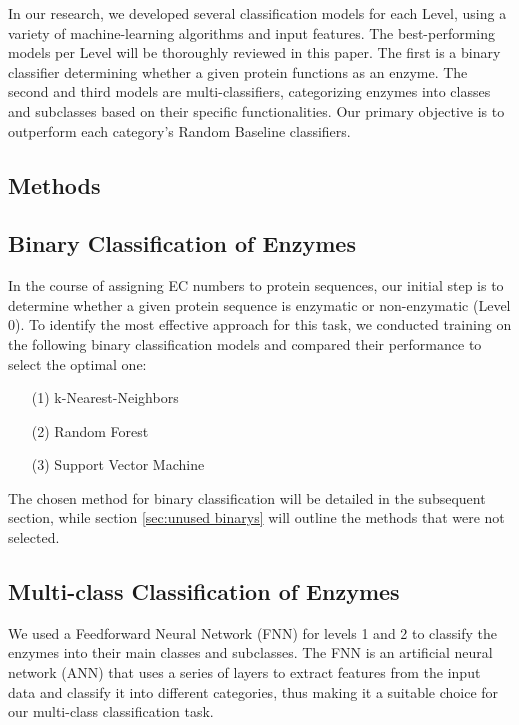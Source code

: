 \documentclass{bioinfo}
\begin{document}
In our research, we developed several classification models for each Level, using a variety of machine-learning algorithms and input features.
The best-performing models per Level will be thoroughly reviewed in this paper.
The first is a binary classifier determining whether a given protein functions as an enzyme. 
The second and third models are multi-classifiers, categorizing enzymes into classes and subclasses 
based on their specific functionalities. 
Our primary objective is to outperform each category's Random Baseline classifiers.

\begin{methods}
\section{Methods}

\subsection{Binary Classification of Enzymes}
In the course of assigning EC numbers to protein sequences,
our initial step is to determine whether a given protein sequence is enzymatic or non-enzymatic (Level 0).
To identify the most effective approach for this task,
we conducted training on the following binary classification models and compared their performance to select the optimal one:
\begin{enumerate}
	\item[(1)] k-Nearest-Neighbors
	\item[(2)] Random Forest 
	\item[(3)] Support Vector Machine
\end{enumerate}
The chosen method for binary classification will be detailed in the subsequent section, while section \ref{sec:unused binarys} will outline the methods that were not selected.

\subsection{Multi-class Classification of Enzymes}
We used a Feedforward Neural Network (FNN) for levels 1 and 2 to classify the enzymes into their main classes and subclasses.
The FNN is an artificial neural network (ANN) that uses a series of layers to extract features from the input data and classify it into different categories,
thus making it a suitable choice for our multi-class classification task. 


\end{methods}
\end{document}
